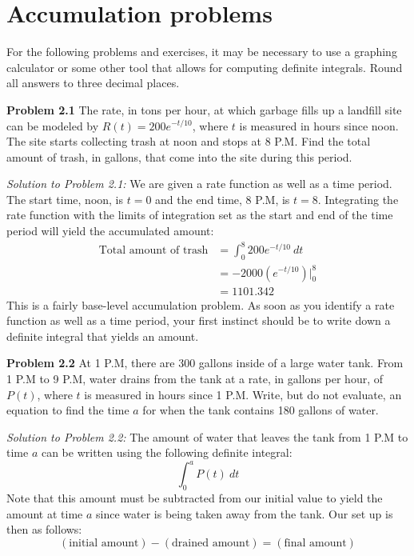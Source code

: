 \documentclass[11pt]{scrartcl}
\begin{document}
\section{Accumulation problems}
\noindent 
For the following problems and exercises, it may be necessary to use a graphing calculator or some other tool that allows for computing definite integrals. Round all answers to three decimal places. 
\begin{tcolorbox}[colback=purple!5!white,colframe=purple!75!black]
\textbf{Problem 2.1} The rate, in tons per hour, at which garbage fills up a landfill site can be modeled by $R(t)=200e^{-t/10}$, where $t$ is measured in hours since noon. The site starts collecting trash at noon and stops at 8 P.M. Find the total amount of trash, in gallons, that come into the site during this period. 
\end{tcolorbox}
\noindent 
\textit{Solution to Problem 2.1:} We are given a rate function as well as a time period. The start time, noon, is $t=0$ and the end time, 8 P.M, is $t=8$. Integrating the rate function with the limits of integration set as the start and end of the time period will yield the accumulated amount:
\begin{align*}
    \text{Total amount of trash} &=\int_0^8{200e^{-t/10} \ dt} \\
    &=-2000(e^{-t/10})\biggr \rvert_0^8 \\
    &=1101.342
\end{align*}
\noindent 
This is a fairly base-level accumulation problem. As soon as you identify a rate function as well as a time period, your first instinct should be to write down a definite integral that yields an amount. 
\begin{tcolorbox}[colback=purple!5!white,colframe=purple!75!black]
\textbf{Problem 2.2} At 1 P.M, there are 300 gallons inside of a large water tank. From 1 P.M to 9 P.M, water drains from the tank at a rate, in gallons per hour, of $P(t)$, where $t$ is measured in hours since 1 P.M. Write, but do not evaluate, an equation to find the time $a$ for when the tank contains 180 gallons of water. 
\end{tcolorbox}
\noindent 
\textit{Solution to Problem 2.2:} The amount of water that leaves the tank from 1 P.M to time $a$ can be written using the following definite integral: 
$$\int_0^a{P(t) \ dt}$$
\noindent 
Note that this amount must be subtracted from our initial value to yield the amount at time $a$ since water is being taken away from the tank. Our set up is then as follows: 
$$(\text{initial amount})-(\text{drained amount})=(\text{final amount})$$
\end{document}
